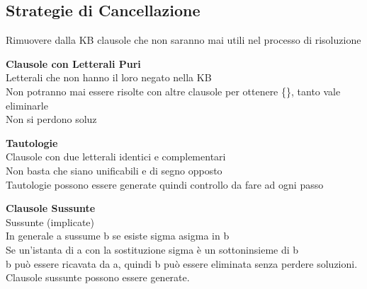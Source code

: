 \documentclass[10pt]{book}
\begin{document}
\subsection{Strategie di Cancellazione}
Rimuovere dalla KB clausole che non saranno mai utili nel processo di risoluzione
\begin{list}{}{}
	\item \textbf{Clausole con Letterali Puri}\\
	Letterali che non hanno il loro negato nella KB\\
	Non potranno mai essere risolte con altre clausole per ottenere \{\}, tanto vale eliminarle\\
	Non si perdono soluz
	\item \textbf{Tautologie}\\
	Clausole con due letterali identici e complementari\\
	Non basta che siano unificabili e di segno opposto\\
	Tautologie possono essere generate quindi controllo da fare ad ogni passo
	\item \textbf{Clausole Sussunte}\\
	Sussunte (implicate)\\ %
	In generale a sussume b se esiste sigma asigma in b\\
	Se un'istanta di a con la sostituzione sigma è un sottoninsieme di b\\
	b può essere ricavata da a, quindi b può essere eliminata senza perdere soluzioni. Clausole sussunte possono essere generate.
\end{list}
\pagebreak
\end{document}
